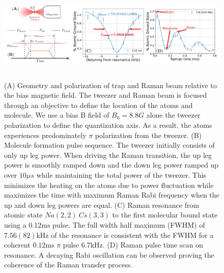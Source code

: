 \documentclass[aps,prl,twocolumn,groupedaddress]{revtex4-1}
\begin{document}
\begin{figure}[ht!]
  \includegraphics[height=4.5cm]{fig2.pdf}
  \caption{
    (A) Geometry and polarization of trap and Raman beam relative to the bias magnetic field.
    The tweezer and Raman beam is focused through an objective to define the location of the
    atoms and molecule.
    We use a bias B field of $B_0=8.8 G$ alone the tweezer polarization
    to define the quantization axis.
    As a result, the atoms experiences predominately $\pi$ polarization from the tweezer.
    (B) Molecule formation pulse sequence. The tweezer initially consists of only up leg power.
    When driving the Raman transition, the up leg power is smoothly ramped down and
    the down leg power ramped up over $10\mu s$ while maintaining the total power of the tweezer.
    This minimizes the heating on the atoms due to power fluctuation while maximizes the time
    with maximum Raman Rabi frequency when the up and down leg powers are equal.
    (C) Raman resonance from atomic state $Na(2,2)\ Cs(3,3)$ to the first molecular bound state
    using a $0.12\mathrm{ms}$ pulse.
    The full width half maximum (FWHM) of $7.56(82) \mathrm{kHz}$ of the resonance
    is consistent with the FWHM for a coherent $0.12\mathrm{ms}$ $\pi$ pulse $6.7 \mathrm{kHz}$.
    (D) Raman pulse time scan on resonance. A decaying Rabi oscillation can be observed
    proving the coherence of the Raman transfer process.
    \label{f-raman}}
\end{figure}
\end{document}

